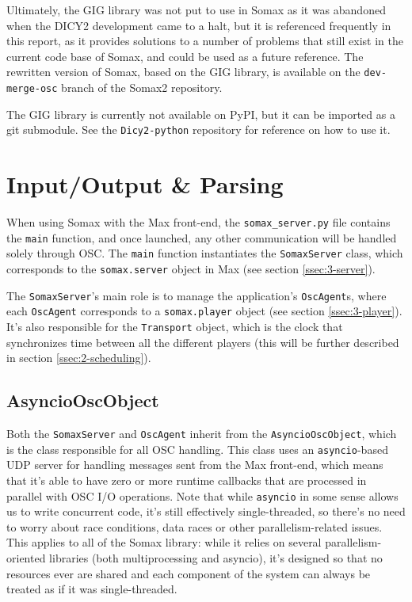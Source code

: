 Ultimately, the GIG library was not put to use in Somax as it was abandoned when the DICY2 development came to a halt, but it is referenced frequently in this report, as it provides solutions to a number of problems that still exist in the current code base of Somax, and could be used as a future reference. The rewritten version of Somax, based on the GIG library, is available on the \texttt{dev-merge-osc} branch of the Somax2 repository.

The GIG library is currently not available on PyPI, but it can be imported as a git submodule. See the \texttt{Dicy2-python} repository \cite{dicy2pythonrepo} for reference on how to use it.



\section{Input/Output \& Parsing}\label{ssec:2-io-parsing}
When using Somax with the Max front-end, the \texttt{somax\_server.py} file contains the \texttt{main} function, and once launched, any other communication will be handled solely through OSC. The \texttt{main} function instantiates the \texttt{SomaxServer} class, which corresponds to the \texttt{somax.server} object in Max (see section \ref{ssec:3-server}).

The \texttt{SomaxServer}'s main role is to manage the application's \texttt{OscAgent}s, where each \texttt{OscAgent} corresponds to a \texttt{somax.player} object (see section \ref{ssec:3-player}). It's also responsible for the \texttt{Transport} object, which is the clock that synchronizes time between all the different players (this will be further described in section \ref{ssec:2-scheduling}). 


\subsection{AsyncioOscObject}

Both the \texttt{SomaxServer} and \texttt{OscAgent} inherit from the \texttt{AsyncioOscObject}, which is the class responsible for all OSC handling. This class uses an \texttt{asyncio}-based \cite{pyasyncio2021} UDP server for handling messages sent from the Max front-end, which means that it's able to have zero or more runtime callbacks that are processed in parallel with OSC I/O operations. Note that while \texttt{asyncio} in some sense allows us to write concurrent code, it's still effectively single-threaded, so there's no need to worry about race conditions, data races or other parallelism-related issues. This applies to all of the Somax library: while it relies on several parallelism-oriented libraries (both multiprocessing \cite{pymultiproc2021} and asyncio), it's designed so that no resources ever are shared and each component of the system can always be treated as if it was single-threaded.

